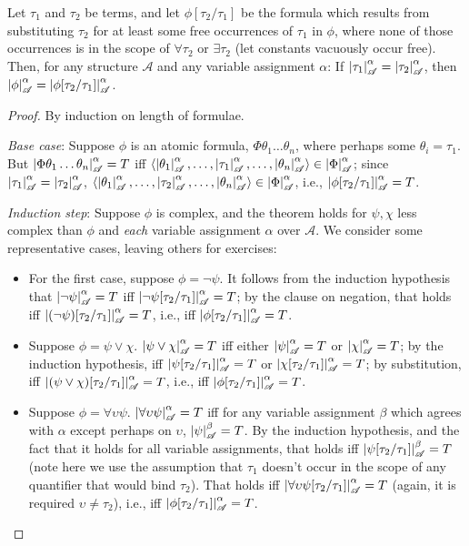 \begin{theorem}
	Let $\tau_{1}$ and $\tau_{2}$ be terms, and let $\phi[\tau_{2}/\tau_{1}]$ be the formula which results from substituting $\tau_{2}$ for at least some free occurrences of $\tau_{1}$ in $\phi$, where none of those occurrences is in the scope of $\forall\tau_{2}$ or $\exists\tau_{2}$ (let constants vacuously occur free). Then, for any structure $\mathscr{A}$ and any variable assignment $\alpha$: If $\left|\tau_{1}\right|^{\alpha}_{\mathscr{A}}=\left|\tau_{2}\right|^{\alpha}_{\mathscr{A}}$, then $\left|\phi\right|^{\alpha}_{\mathscr{A}}=\left|\phi[\tau_{2}/\tau_{1}]\right|^{\alpha}_{\mathscr{A}}$.
		\begin{proof} By induction on length of formulae. 
			
			\emph{Base case}: Suppose $\phi$ is an atomic formula, $\Phi\theta_{1}\ldots\theta_{n}$, where perhaps some $\theta_{i}=\tau_{1}$. But $\left|\Phi\theta_{1}\ldots\theta_{n}\right|^{\alpha}_{\mathscr{A}}=T$ iff $\langle\left|\theta_{1}\right|^{\alpha}_{\mathscr{A}},\ldots,\left|\tau_{1}\right|^{\alpha}_{\mathscr{A}},\ldots,\left|\theta_{n}\right|^{\alpha}_{\mathscr{A}}\rangle \in \left|\Phi\right|^{\alpha}_{\mathscr{A}}$; since $\left|\tau_{1}\right|^{\alpha}_{\mathscr{A}}=\left|\tau_{2}\right|^{\alpha}_{\mathscr{A}}$, $\langle\left|\theta_{1}\right|^{\alpha}_{\mathscr{A}},\ldots,\left|\tau_{2}\right|^{\alpha}_{\mathscr{A}},\ldots,\left|\theta_{n}\right|^{\alpha}_{\mathscr{A}}\rangle \in \left|\Phi\right|^{\alpha}_{\mathscr{A}}$, i.e., $\left|\phi[\tau_{2}/\tau_{1}]\right|^{\alpha}_{\mathscr{A}}=T$.


\emph{Induction step}: Suppose $\phi$ is complex, and the theorem holds for $\psi,\chi$ less complex than $\phi$ and \emph{each} variable assignment $\alpha$ over $\mathscr{A}$. We consider some representative cases, leaving others for exercises: \begin{itemize}
	\item For the first case, suppose $\phi = \neg\psi$. It follows from the induction hypothesis that $\left|\neg\psi\right|^{\alpha}_{\mathscr{A}}=T$ iff $\left|\neg\psi[\tau_{2}/\tau_{1}]\right|^{\alpha}_{\mathscr{A}}=T$; by the clause on negation, that holds iff $\left|(\neg\psi)[\tau_{2}/\tau_{1}]\right|^{\alpha}_{\mathscr{A}}=T$, i.e., iff $\left|\phi[\tau_{2}/\tau_{1}]\right|^{\alpha}_{\mathscr{A}}=T$.
	\item Suppose $\phi=\psi\vee\chi$.  $\left|\psi\vee\chi\right|^{\alpha}_{\mathscr{A}}=T$ iff either $\left|\psi\right|^{\alpha}_{\mathscr{A}}=T$ or $\left|\chi\right|^{\alpha}_{\mathscr{A}}=T$; by the induction hypothesis, iff $\left|\psi[\tau_{2}/\tau_{1}]\right|^{\alpha}_{\mathscr{A}}=T$ or $\left|\chi[\tau_{2}/\tau_{1}]\right|^{\alpha}_{\mathscr{A}}=T$; by substitution, iff $\left|(\psi\vee\chi)[\tau_{2}/\tau_{1}]\right|^{\alpha}_{\mathscr{A}}=T$, i.e., iff $\left|\phi[\tau_{2}/\tau_{1}]\right|^{\alpha}_{\mathscr{A}}=T$.
	\item Suppose $\phi = \forall \upsilon \psi$. $\left|\forall\upsilon\psi\right|^{\alpha}_{\mathscr{A}}=T$ iff for any variable assignment $\beta$ which agrees with $\alpha$ except perhaps on $\upsilon$, $\left|\psi\right|^{\beta}_{\mathscr{A}}=T$. By the induction hypothesis, and the fact that it holds for all variable assignments, that holds iff $\left|\psi[\tau_{2}/\tau_{1}]\right|^{\beta}_{\mathscr{A}}=T$ (note here we use the assumption that $\tau_{1}$ doesn't occur in the scope of any quantifier that would bind $\tau_{2}$). That holds iff $\left|\forall\upsilon\psi[\tau_{2}/\tau_{1}]\right|^{\alpha}_{\mathscr{A}}=T$ (again, it is required $\upsilon\neq\tau_{2}$), i.e., iff $\left|\phi[\tau_{2}/\tau_{1}]\right|^{\alpha}_{\mathscr{A}}=T$.  
\end{itemize}\end{proof}	\end{theorem}

